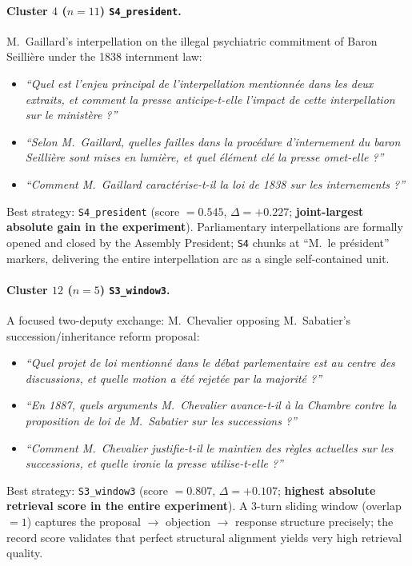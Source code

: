 \paragraph{Cluster $4$ ($n=11$) \texttt{S4\_president}.}
M.~Gaillard's interpellation on the illegal psychiatric commitment of Baron
Seilli\`{e}re under the 1838 internment law:
\begin{itemize}
  \item \textit{``Quel est l'enjeu principal de l'interpellation mentionn\'{e}e
    dans les deux extraits, et comment la presse anticipe-t-elle l'impact de
    cette interpellation sur le minist\`{e}re ?''}
  \item \textit{``Selon M.~Gaillard, quelles failles dans la proc\'{e}dure
    d'internement du baron Seilli\`{e}re sont mises en lumi\`{e}re, et quel
    \'{e}l\'{e}ment cl\'{e} la presse omet-elle ?''}
  \item \textit{``Comment M.~Gaillard caract\'{e}rise-t-il la loi de 1838 sur les
    internements ?''}
\end{itemize}
Best strategy: \texttt{S4\_president} (score $= 0.545$, $\Delta = +0.227$;
\textbf{joint-largest absolute gain in the experiment}).
Parliamentary interpellations are formally opened and closed by the Assembly
President; \texttt{S4} chunks at ``M.~le pr\'{e}sident'' markers, delivering the
entire interpellation arc as a single self-contained unit.

\paragraph{Cluster $12$ ($n=5$) \texttt{S3\_window3}.}
A focused two-deputy exchange: M.~Chevalier opposing M.~Sabatier's
succession/inheritance reform proposal:
\begin{itemize}
  \item \textit{``Quel projet de loi mentionn\'{e} dans le d\'{e}bat
    parlementaire est au centre des discussions, et quelle motion a \'{e}t\'{e}
    rejet\'{e}e par la majorit\'{e} ?''}
  \item \textit{``En 1887, quels arguments M.~Chevalier avance-t-il \`{a} la
    Chambre contre la proposition de loi de M.~Sabatier sur les successions ?''}
  \item \textit{``Comment M.~Chevalier justifie-t-il le maintien des r\`{e}gles
    actuelles sur les successions, et quelle ironie la presse utilise-t-elle ?''}
\end{itemize}
Best strategy: \texttt{S3\_window3} (score $= 0.807$, $\Delta = +0.107$;
\textbf{highest absolute retrieval score in the entire experiment}).
A 3-turn sliding window (overlap $= 1$) captures the proposal $\to$ objection
$\to$ response structure precisely; the record score validates that perfect
structural alignment yields very high retrieval quality.

